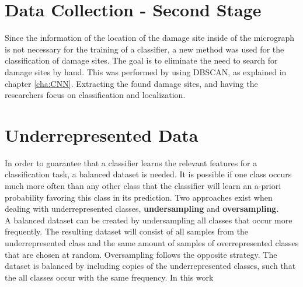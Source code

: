 \section{Data Collection - Second Stage}

Since the information of the location of the damage site inside of the micrograph is not necessary for the training of a classifier, a new method was used for the classification of damage sites. The goal is to eliminate the need to search for damage sites by hand. This was performed by using DBSCAN, as explained in chapter \ref{cha:CNN}. Extracting the found damage sites, and having the researchers focus on classification and localization. \\

\section{Underrepresented Data}

In order to guarantee that a classifier learns the relevant features for a classification task, a balanced dataset is needed. It is possible if one class occurs much more often than any other class that the classifier will learn an a-priori probability favoring this class in its prediction. Two approaches exist when dealing with underrepresented classes, \textbf{undersampling} and \textbf{oversampling}.\\

A balanced dataset can be created by undersampling all classes that occur more frequently. The resulting dataset will consist of all samples from the underrepresented class and the same amount of samples of overrepresented classes that are chosen at random. Oversampling follows the opposite strategy. The dataset is balanced by including copies of the underrepresented classes, such that the all classes occur with the same frequency. In this work 





